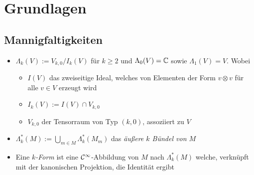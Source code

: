 \chapter{Grundlagen}
\section{Mannigfaltigkeiten}
\begin{comment}
Hier sollen einige Grundlagen über differenzierbare Mannigfaltigkeiten
wiederholt werden. Siehe dazu \cite[1.22ff]{warnerLie}.
\end{comment}
\begin{comment}
\begin{defn} \ccite[Defn 1.22]{warnerLie}
Sei $\psi :M\overset{\cC^\infty}\to N$ eine Abbildung und sei $m\in M$. Das
\emph{Differenzial} von $\psi$ an $m$ ist die lineare Abbildung
$d\psi:M_m\to N_{\psi(m)}$, welche wie folgt definiert ist. ...
\end{defn}
\end{comment}
\begin{comment}
\begin{defn}
\dots der \emph{Tangentialraum $G_e$ am Element $e$} ist definiert als\dots
\end{defn}
\end{comment}

\begin{defn}
\begin{itemize}
\item 
{}
$\Lambda_k(V):=V_{k,0}/I_k(V)$ für $k\geq2$ und $\Lambda_0(V)=\mathbb{C}$ sowie
$\Lambda_1(V)=V$. Wobei
\begin{itemize}
\item $I(V)$ das zweiseitige Ideal, welches von Elementen der
Form $v\otimes v$ für alle $v\in V$ erzeugt wird
\item $I_k(V):=I(V)\cap V_{k,0}$
\item $V_{k,0}$ der Tensorraum von Typ $(k,0)$, assoziiert zu $V$ 
\end{itemize}
\item 
{}
$\Lambda_k^*(M):=\underset{m\in M}\bigcup\Lambda_k^*(M_m)$ das \emph{äußere $k$
Bündel von $M$}
\item 
{}
Eine \emph{$k$-Form} ist eine $\mathcal{C}^\infty$-Abbildung von $M$ nach
$\Lambda_k^*(M)$ welche, verknüpft mit der kanonischen Projektion, die
Identität ergibt
\end{itemize}
\end{defn}

